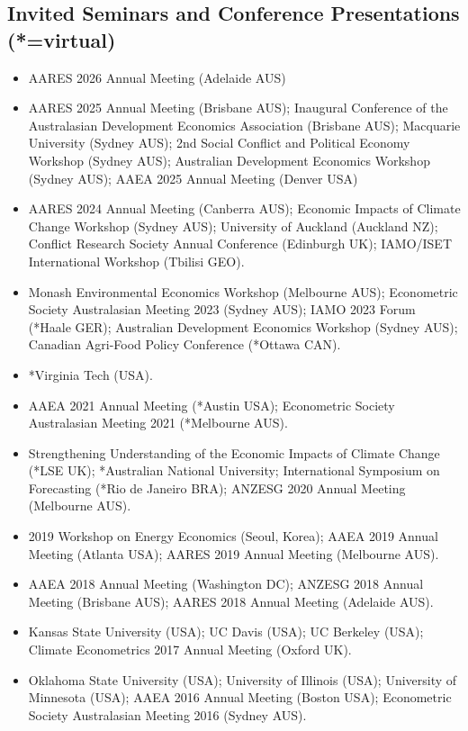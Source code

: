 \documentclass[10pt]{article}
\begin{document}
	\subsection*{Invited Seminars and Conference Presentations (*=virtual)}
	\begin{itemize}
		\item {} AARES 2026 Annual Meeting (Adelaide AUS)
		\item {} AARES 2025 Annual Meeting (Brisbane AUS); Inaugural Conference of the Australasian Development Economics Association (Brisbane AUS); Macquarie University (Sydney AUS); 2nd Social Conflict and Political Economy Workshop (Sydney AUS); Australian Development Economics Workshop (Sydney AUS); AAEA 2025 Annual Meeting (Denver USA)
		\item {} AARES 2024 Annual Meeting (Canberra AUS); Economic Impacts of Climate Change Workshop (Sydney AUS); University of Auckland (Auckland NZ); Conflict Research Society Annual Conference (Edinburgh UK); IAMO/ISET International Workshop (Tbilisi GEO).
		\item {} Monash Environmental Economics Workshop (Melbourne AUS); Econometric Society Australasian Meeting 2023 (Sydney AUS); IAMO 2023 Forum (*Haale GER); Australian Development Economics Workshop (Sydney AUS); Canadian Agri-Food Policy Conference (*Ottawa CAN).
		\item {} *Virginia Tech (USA).
		\item {} AAEA 2021 Annual Meeting (*Austin USA); Econometric Society Australasian Meeting 2021 (*Melbourne AUS).
		\item {} Strengthening Understanding of the Economic Impacts of Climate Change (*LSE UK); *Australian National University; International Symposium on Forecasting (*Rio de Janeiro BRA); ANZESG 2020 Annual Meeting (Melbourne AUS).
		\item {} 2019 Workshop on Energy Economics (Seoul, Korea); AAEA 2019 Annual Meeting (Atlanta USA); AARES 2019 Annual Meeting (Melbourne AUS).
		\item {} AAEA 2018 Annual Meeting (Washington DC); ANZESG 2018 Annual Meeting (Brisbane AUS); AARES 2018 Annual Meeting (Adelaide AUS).
		\item {} Kansas State University (USA); UC Davis (USA); UC Berkeley (USA); Climate Econometrics 2017 Annual Meeting (Oxford UK).
		\item {} Oklahoma State University (USA); University of Illinois (USA); University of Minnesota (USA); AAEA 2016 Annual Meeting (Boston USA); Econometric Society Australasian Meeting 2016 (Sydney AUS).

\end{itemize}
\end{document}

